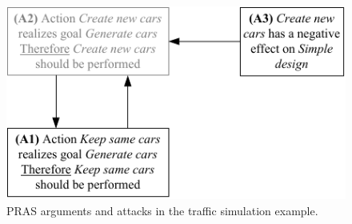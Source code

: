 \begin{figure}[h]
\centering
\includegraphics[]{img/fig_AF1.pdf}
\caption{PRAS arguments and attacks in the traffic simulation example.}
\label{fig:pras:example}
\end{figure}

